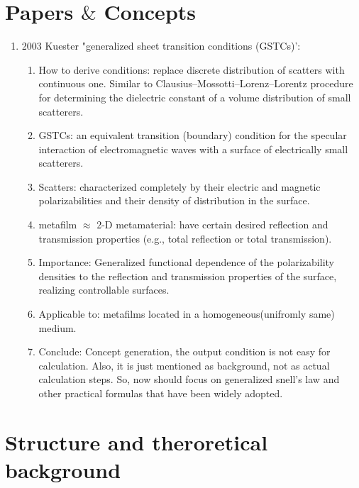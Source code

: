 \documentclass[]{article}
\begin{document}
	\section*{Papers $\&$ Concepts}
	\begin{enumerate}
		\item 2003 Kuester "generalized sheet transition conditions (GSTCs)':
		\begin{enumerate}
			\item How to derive conditions: replace discrete distribution of scatters with continuous one. Similar to Clausius–Mossotti–Lorenz–Lorentz procedure for determining the dielectric constant of a volume distribution of small
			scatterers.
			\item GSTCs: an equivalent transition
			(boundary) condition for the specular interaction of electromagnetic waves with a surface of electrically small scatterers.
			\item Scatters: characterized completely by
			their electric and magnetic polarizabilities and their density of
			distribution in the surface.
			\item metafilm $\approx$ 2-D metamaterial: have certain desired reflection and transmission properties (e.g., total reflection or total transmission).
			\item Importance: Generalized functional dependence of the polarizability densities to
			the reflection and transmission properties of the surface, realizing controllable surfaces.
			\item Applicable to: metafilms
			located in a homogeneous(unifromly same) medium.
			\item Conclude: Concept generation, the output condition is not easy for calculation. Also, it is just mentioned as background, not as actual calculation steps. So, now should focus on generalized snell's law and other practical formulas that have been widely adopted.
		\end{enumerate}
		
	\end{enumerate}
	
	
	
	\section*{Structure and theroretical background}
\end{document}
